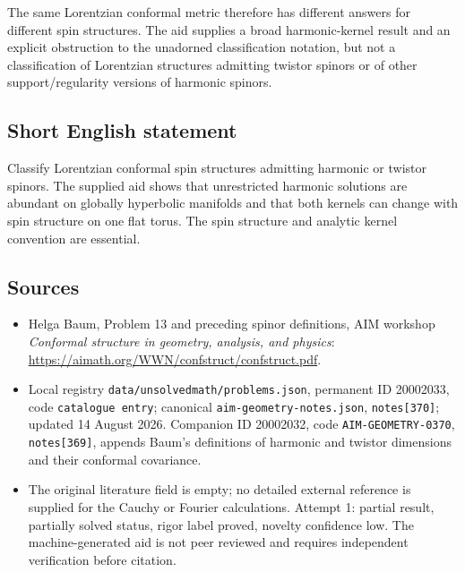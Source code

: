 \documentclass[11pt]{article}
\begin{document}
The same Lorentzian conformal metric therefore has different answers for different spin structures. The aid supplies a broad harmonic-kernel result and an explicit obstruction to the unadorned classification notation, but not a classification of Lorentzian structures admitting twistor spinors or of other support/regularity versions of harmonic spinors.
\subsection{Short English statement}
Classify Lorentzian conformal spin structures admitting harmonic or twistor spinors. The supplied aid shows that unrestricted harmonic solutions are abundant on globally hyperbolic manifolds and that both kernels can change with spin structure on one flat torus. The spin structure and analytic kernel convention are essential.
\subsection{Sources}
\begin{itemize}
\item Helga Baum, Problem 13 and preceding spinor definitions, AIM workshop \emph{Conformal structure in geometry, analysis, and physics}: \url{https://aimath.org/WWN/confstruct/confstruct.pdf}.
\item Local registry \texttt{data/unsolvedmath/problems.json}, permanent ID 20002033, code \texttt{catalogue entry}; canonical \texttt{aim-geometry-notes.json}, \texttt{notes[370]}; updated 14 August 2026. Companion ID 20002032, code \texttt{AIM-GEOMETRY-0370}, \texttt{notes[369]}, appends Baum's definitions of harmonic and twistor dimensions and their conformal covariance.
\item The original literature field is empty; no detailed external reference is supplied for the Cauchy or Fourier calculations. Attempt 1: partial result, partially solved status, rigor label proved, novelty confidence low. The machine-generated aid is not peer reviewed and requires independent verification before citation.
\end{itemize}
\end{document}
